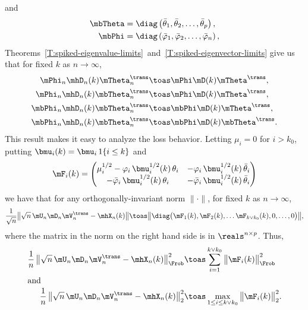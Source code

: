 and
\begin{align*}
    \mbTheta
        &=
            \diag\left(
                \bar \theta_1,
                \bar \theta_2,
                \ldots,
                \bar \theta_p
            \right), \\
    \mbPhi
        &=
            \diag\left(
                \bar \varphi_1,
                \bar \varphi_2,
                \ldots,
                \bar \varphi_n
            \right),
\end{align*}
Theorems~\ref{T:spiked-eigenvalue-limits}~and~\ref{T:spiked-eigenvector-limits}
give us that for fixed $k$ as $n \to \infty$,
\begin{align*}
    \mPhi_n \mhD_n(k) \mTheta_n^\trans
        &\toas
            \mPhi \mD(k) \mTheta^\trans, \\
    \mPhi_n \mhD_n(k) \mbTheta_n^\trans
        &\toas
            \mPhi \mD(k) \mTheta^\trans, \\
    \mbPhi_n \mhD_n(k) \mbTheta_n^\trans
        &\toas
            \mbPhi \mD(k) \mTheta^\trans, \\
    \mbPhi_n \mhD_n(k) \mbTheta_n^\trans
        &\toas
            \mbPhi \mD(k) \mbTheta^\trans.
\end{align*}
This result makes it easy to analyze the loss behavior.  Letting $\mu_i = 0$
for $i > k_0$, putting $\bmu_i(k) = \bmu_i \, 1\{i \leq k\}$ and
\[
    \mF_i(k)
        =
            \left(
            \begin{matrix}
                \mu_i^{1/2} - \varphi_i \, \bmu_i^{1/2}(k) \, \theta_i &
                    -\varphi_i \, \bmu_i^{1/2}(k) \, \bar \theta_i \\
                -\bar \varphi_i \, \bmu_i^{1/2}(k) \, \theta_i &
                    -\bar \varphi_i \, \bmu_i^{1/2}(k) \, \bar \theta_i
            \end{matrix}
            \right)
\]
we have that for any orthogonally-invariant norm $\| \cdot \|$, for
fixed $k$ as $n\to \infty$,
\[
    \frac{1}{\sqrt{n}}
    \big\| \sqrt{n} \, \mU_n \mD_n \mV_n^\trans - \mhX_n(k) \big\|
        \toas
            \big\|
                \diag \big(
                    \mF_1(k),
                    \mF_2(k),
                    \ldots
                    \mF_{k \vee k_0}(k),
                    0,
                    \ldots,
                    0
                \big) \big\|,
\]
where the matrix in the norm on the right hand side is in 
$\reals^{n \times p}$.
Thus,
\begin{align*}
    \frac{1}{n} \,
    \big\| \sqrt{n} \, \mU_n \mD_n \mV_n^\trans - \mhX_n(k) \big\|_\Frob^2
        &\toas
            \sum_{i=1}^{k \vee k_0}
                \big\| \mF_i(k) \big\|_\Frob^2 \\
\intertext{and}
    \frac{1}{n} \,
    \big\| \sqrt{n} \, \mU_n \mD_n \mV_n^\trans - \mhX_n(k) \big\|_2^2
        &\toas
            \max_{1 \leq i \leq k \vee k_0}
                \big\| \mF_i(k) \big\|_2^2.
\end{align*}
